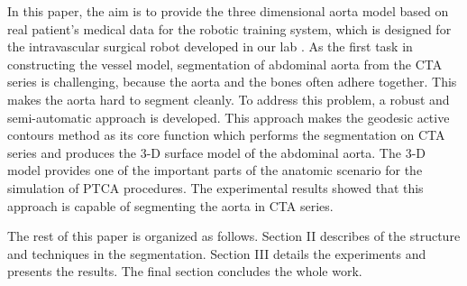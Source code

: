 
In this paper, the aim is to provide the three dimensional aorta model based on real patient's medical data for the robotic training system, which is designed for the intravascular surgical robot developed in our lab \cite{Ji2011CASIA}.
As the first task in constructing the vessel model, segmentation of abdominal aorta from the CTA series is challenging, because the aorta and the bones often adhere together.
This makes the aorta hard to segment cleanly.
To address this problem, a robust and semi-automatic approach is developed.
This approach makes the geodesic active contours method \cite{Caselles1997} as its core function which performs the segmentation on CTA series and produces the 3-D surface model of the abdominal aorta.
The 3-D model provides one of the important parts of the anatomic scenario for the simulation of PTCA procedures.
The experimental results showed that this approach is capable of segmenting the aorta in CTA series.

The rest of this paper is organized as follows.
Section II describes of the structure and techniques in the segmentation.
Section III details the experiments and presents the results.
The final section concludes the whole work. %